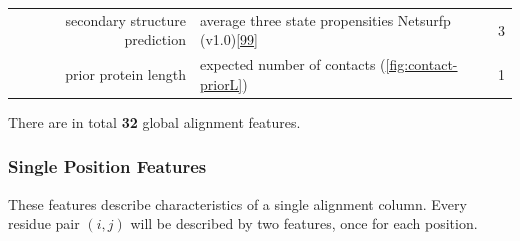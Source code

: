 \documentclass[12pt,a4paper,twoside]{book}
\theoremstyle{definition}
\theoremstyle{definition}
\theoremstyle{remark}
\begin{document}
\begin{longtable}[]{@{}rlc@{}}
\begin{minipage}[t]{0.23\columnwidth}
secondary structure prediction\strut
\end{minipage} & \begin{minipage}[t]{0.50\columnwidth}\raggedright\strut
average three state propensities Netsurfp
(v1.0){[}\protect\hyperlink{ref-Petersen2009a}{99}{]}\strut
\end{minipage} & \begin{minipage}[t]{0.18\columnwidth}\centering\strut
3\strut
\end{minipage}\tabularnewline
\begin{minipage}[t]{0.23\columnwidth}\raggedleft\strut
prior protein length\strut
\end{minipage} & \begin{minipage}[t]{0.50\columnwidth}\raggedright\strut
expected number of contacts (\ref{fig:contact-priorL})\strut
\end{minipage} & \begin{minipage}[t]{0.18\columnwidth}\centering\strut
1\strut
\end{minipage}\tabularnewline
\bottomrule
\end{longtable}

There are in total \textbf{32} global alignment features.

\subsubsection{Single Position Features}\label{seq-features-single}

These features describe characteristics of a single alignment column.
Every residue pair \((i,j)\) will be described by two features, once for
each position.
\end{document}
